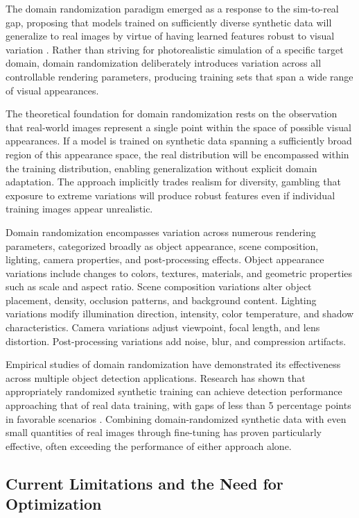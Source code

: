 The domain randomization paradigm emerged as a response to the sim-to-real gap, proposing that models trained on sufficiently diverse synthetic data will generalize to real images by virtue of having learned features robust to visual variation \cite{tobin2017domain}. Rather than striving for photorealistic simulation of a specific target domain, domain randomization deliberately introduces variation across all controllable rendering parameters, producing training sets that span a wide range of visual appearances.

The theoretical foundation for domain randomization rests on the observation that real-world images represent a single point within the space of possible visual appearances. If a model is trained on synthetic data spanning a sufficiently broad region of this appearance space, the real distribution will be encompassed within the training distribution, enabling generalization without explicit domain adaptation. The approach implicitly trades realism for diversity, gambling that exposure to extreme variations will produce robust features even if individual training images appear unrealistic.

Domain randomization encompasses variation across numerous rendering parameters, categorized broadly as object appearance, scene composition, lighting, camera properties, and post-processing effects. Object appearance variations include changes to colors, textures, materials, and geometric properties such as scale and aspect ratio. Scene composition variations alter object placement, density, occlusion patterns, and background content. Lighting variations modify illumination direction, intensity, color temperature, and shadow characteristics. Camera variations adjust viewpoint, focal length, and lens distortion. Post-processing variations add noise, blur, and compression artifacts.

Empirical studies of domain randomization have demonstrated its effectiveness across multiple object detection applications. Research has shown that appropriately randomized synthetic training can achieve detection performance approaching that of real data training, with gaps of less than 5 percentage points in favorable scenarios \cite{tremblay2018training}. Combining domain-randomized synthetic data with even small quantities of real images through fine-tuning has proven particularly effective, often exceeding the performance of either approach alone.

\subsection{Current Limitations and the Need for Optimization}
\label{subsec:limitations_need_optimization}

